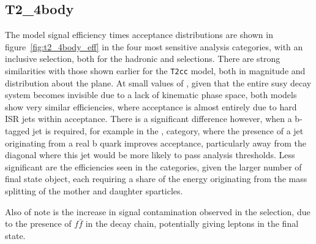 
\subsection{T2\_4body}

The \Ttwodegen model signal efficiency times acceptance distributions are shown 
in figure~\ref{fig:t2_4body_eff} in the four most sensitive analysis categories,
with an inclusive \HT selection, both for the hadronic and \mj selections. There
are strong similarities with those shown earlier for the \texttt{T2cc} model, 
both in magnitude and distribution about the plane. At small values of \deltam, 
given that the entire susy decay system becomes invisible due to a lack of 
kinematic phase space, both models show very similar efficiencies, where 
acceptance is almost entirely due to hard ISR jets within acceptance. There is a
significant difference however, when a b-tagged jet is required, for example in 
the \njlow,  category, where the presence of a jet originating from a real 
b quark improves acceptance, particularly away from the diagonal where this jet 
would be more likely to pass analysis thresholds. Less significant are the 
efficiencies seen in the \njhigh categories, given the larger number of final 
state object, each requiring a share of the energy originating from the mass 
splitting of the mother and daughter sparticles.

Also of note is the increase in signal contamination observed in the \mj 
selection, due to the presence of $f\bar{f}$ in the decay chain, potentially 
giving leptons in the final state.

